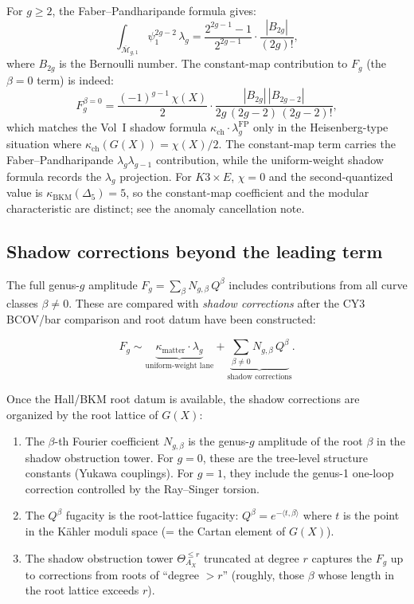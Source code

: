 \documentclass[11pt]{amsart}
\theoremstyle{plain}
\theoremstyle{definition}
\theoremstyle{remark}
\newcommand{\Mbar}{\overline{\mathcal{M}}}
\begin{document}
For $g \geq 2$, the Faber--Pandharipande formula gives:
\[
 \int_{\Mbar_{g,1}} \psi_1^{2g-2}\, \lambda_g
 = \frac{2^{2g-1}-1}{2^{2g-1}} \cdot \frac{|B_{2g}|}{(2g)!},
\]
where $B_{2g}$ is the Bernoulli number. The constant-map contribution to
$F_g$ (the $\beta = 0$ term) is indeed:
\begin{equation}\label{eq:fg-constant}
 F_g^{\beta=0} = \frac{(-1)^{g-1}\, \chi(X)}{2}
 \cdot \frac{|B_{2g}|\, |B_{2g-2}|}{2g\,(2g-2)\,(2g-2)!},
\end{equation}
which matches the Vol~I shadow formula $\kappa_{\mathrm{ch}} \cdot \lambda_g^{\mathrm{FP}}$
only in the Heisenberg-type situation where
$\kappa_{\mathrm{ch}}(G(X)) = \chi(X)/2$. The constant-map term carries the
Faber--Pandharipande $\lambda_g\lambda_{g-1}$ contribution, while the
uniform-weight shadow formula records the $\lambda_g$ projection. For
$K3 \times E$, $\chi = 0$ and the second-quantized value is
$\kappa_{\mathrm{BKM}}(\Delta_5) = 5$, so the constant-map coefficient and the
modular characteristic are distinct; see the anomaly cancellation note.

\subsection{Shadow corrections beyond the leading term}
\label{sub:shadow-corrections}

The full genus-$g$ amplitude $F_g = \sum_\beta N_{g,\beta}\, Q^\beta$
includes contributions from all curve classes $\beta \neq 0$.
These are compared with \emph{shadow corrections} after the CY3
BCOV/bar comparison and root datum have been constructed:

\begin{equation}\label{eq:fg-shadow}
 F_g \sim \underbrace{\kappa_{\mathrm{matter}} \cdot \lambda_g}_{\text{uniform-weight lane}}
 + \underbrace{\sum_{\beta \neq 0} N_{g,\beta}\, Q^\beta}_{\text{shadow corrections}}.
\end{equation}

Once the Hall/BKM root datum is available, the shadow corrections are
organized by the root lattice of $G(X)$:
\begin{enumerate}[label=(\roman*)]
 \item The $\beta$-th Fourier coefficient $N_{g,\beta}$ is the genus-$g$
 amplitude of the root $\beta$ in the shadow obstruction tower. For $g = 0$, these
 are the tree-level structure constants (Yukawa couplings). For $g = 1$,
 they include the genus-1 one-loop correction controlled by the
 Ray--Singer torsion.
 \item The $Q^\beta$ fugacity is the root-lattice fugacity: $Q^\beta =
 e^{-\langle t, \beta \rangle}$ where $t$ is the point in the K\"ahler
 moduli space (= the Cartan element of $G(X)$).
 \item The shadow obstruction tower $\Theta_{A_X}^{\leq r}$ truncated at
 degree $r$ captures the $F_g$ up to corrections from roots of
 ``degree $> r$'' (roughly, those $\beta$ whose length in the root lattice
 exceeds $r$).
\end{enumerate}
\end{document}
